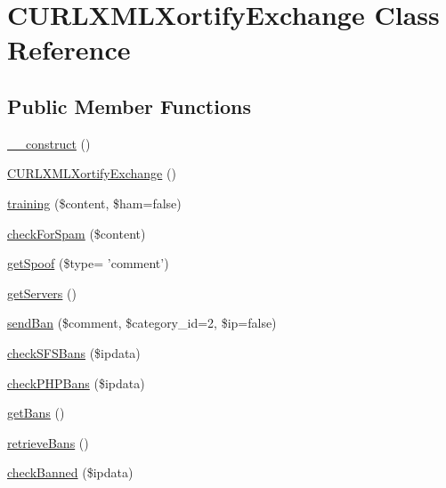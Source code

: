 \hypertarget{class_c_u_r_l_x_m_l_xortify_exchange}{\section{C\-U\-R\-L\-X\-M\-L\-Xortify\-Exchange Class Reference}
\label{class_c_u_r_l_x_m_l_xortify_exchange}
}
\subsection*{Public Member Functions}
\begin{DoxyCompactItemize}
\item 
\hyperlink{class_c_u_r_l_x_m_l_xortify_exchange_a095c5d389db211932136b53f25f39685}{\-\_\-\-\_\-construct} ()
\item 
\hyperlink{class_c_u_r_l_x_m_l_xortify_exchange_a3b76009f81aba09d4775db8b93c36fe3}{C\-U\-R\-L\-X\-M\-L\-Xortify\-Exchange} ()
\item 
\hyperlink{class_c_u_r_l_x_m_l_xortify_exchange_a3b3be735e633ba330c6b5d086aa508cd}{training} (\$content, \$ham=false)
\item 
\hyperlink{class_c_u_r_l_x_m_l_xortify_exchange_a7a4f53c3841dc7806455261af557d514}{check\-For\-Spam} (\$content)
\item 
\hyperlink{class_c_u_r_l_x_m_l_xortify_exchange_ae7926cba79660f77479306100f492c03}{get\-Spoof} (\$type= 'comment')
\item 
\hyperlink{class_c_u_r_l_x_m_l_xortify_exchange_a882f365bc81e207dc2123ef707735e82}{get\-Servers} ()
\item 
\hyperlink{class_c_u_r_l_x_m_l_xortify_exchange_a0293acfa4afe0cb5b2816352a35d8ca7}{send\-Ban} (\$comment, \$category\-\_\-id=2, \$ip=false)
\item 
\hyperlink{class_c_u_r_l_x_m_l_xortify_exchange_a985a563a84e3e5c54694fcce192bda53}{check\-S\-F\-S\-Bans} (\$ipdata)
\item 
\hyperlink{class_c_u_r_l_x_m_l_xortify_exchange_aeb1bf9aaee4718870adbd07333490aaf}{check\-P\-H\-P\-Bans} (\$ipdata)
\item 
\hyperlink{class_c_u_r_l_x_m_l_xortify_exchange_aea26db2906896833d32445a698fc4cdc}{get\-Bans} ()
\item 
\hyperlink{class_c_u_r_l_x_m_l_xortify_exchange_a4af29af927aae9aada97ef0c2cd08fa1}{retrieve\-Bans} ()
\item 
\hyperlink{class_c_u_r_l_x_m_l_xortify_exchange_ae41df0f26620b727f7f63342648f6474}{check\-Banned} (\$ipdata)
\end{DoxyCompactItemize}

